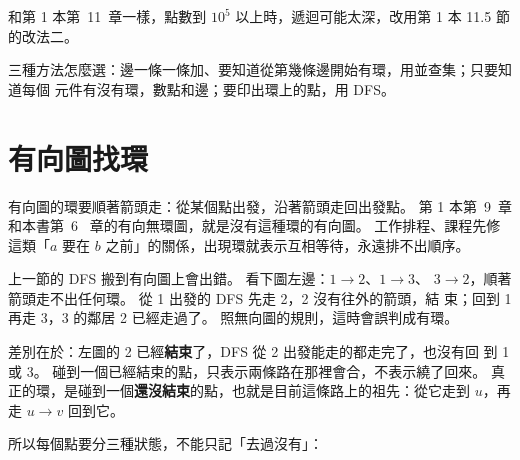 和第 1 本第~11~章一樣，點數到 $10^5$ 以上時，遞迴可能太深，改用第 1 本 11.5 節的改法二。

三種方法怎麼選：邊一條一條加、要知道從第幾條邊開始有環，用並查集；只要知道每個
元件有沒有環，數點和邊；要印出環上的點，用 DFS。

\section{有向圖找環}
\label{sec:cycle-directed}

有向圖的環要順著箭頭走：從某個點出發，沿著箭頭走回出發點。 第 1 本第~9~章和本書第~6~
章的有向無環圖，就是沒有這種環的有向圖。 工作排程、課程先修這類「$a$ 要在 $b$
之前」的關係，出現環就表示互相等待，永遠排不出順序。

上一節的 DFS 搬到有向圖上會出錯。 看下圖左邊：$1 \to 2$、$1 \to 3$、
$3 \to 2$，順著箭頭走不出任何環。 從 1 出發的 DFS 先走 2，2 沒有往外的箭頭，結
束；回到 1 再走 3，3 的鄰居 2 已經走過了。 照無向圖的規則，這時會誤判成有環。

\begin{center}
\label{fig:directed-cycle}
\end{center}

差別在於：左圖的 2 已經\textbf{結束}了，DFS 從 2 出發能走的都走完了，也沒有回
到 1 或 3。 碰到一個已經結束的點，只表示兩條路在那裡會合，不表示繞了回來。 真
正的環，是碰到一個\textbf{還沒結束}的點，也就是目前這條路上的祖先：從它走到
$u$，再走 $u \to v$ 回到它。

所以每個點要分三種狀態，不能只記「去過沒有」：

